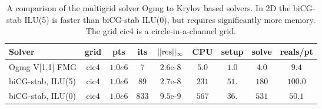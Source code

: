 
\begin{table}[hbt]
\begin{center}
\begin{tabular}{|l|c|c|c|c|c|c|c|c|} \hline 
 Solver             & grid     & pts     & its  & $\vert\vert \mbox{res} \vert\vert_\infty$   & CPU    &  setup & solve  & reals/pt\\   \hline 
%
 Ogmg V[1,1]  FMG   & cic4     & $1.0e6$ &   7  & $2.6$e-$8$  & $5.0$ & $1.0 $ & $4.0$  & $9.4$    \\
 biCG-stab, ILU(5)  & cic4     & $1.0e6$ &  89  & $2.7$e-$8$  & $231$  & $51.$  & $180$  & $100.0$    \\
 biCG-stab, ILU(0)  & cic4     & $1.0e6$ &  833 & $9.5$e-$9$  &$ 567$  & $36.$  &$ 531$  & $ 50.1$    \\ \hline
%
\hline 
\end{tabular}
\end{center}
\caption{A comparison of the multigrid solver Ogmg to Krylov based solvers. In 2D the biCG-stab ILU(5) is faster than
biCG-stab ILU(0), but requires significantly more memory. The grid cic4 is a circle-in-a-channel
grid.}
\label{tab:comparison} 
\end{table}



